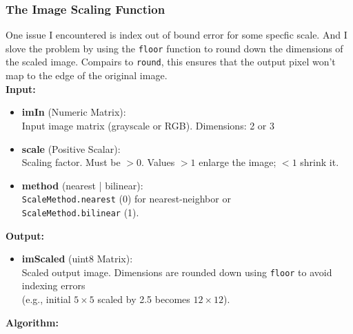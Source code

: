 \documentclass[a4paper,11pt]{article}
\begin{document}
\subsubsection{The Image Scaling Function}
One issue I encountered is index out of bound error for some specfic scale. And I slove the problem by using the \texttt{floor} function to round down the dimensions of the scaled image. Compairs to \texttt{round}, this ensures that the output pixel won't map to the edge of the original image.\\
\textbf{Input:} 
\begin{itemize}
    \item \textbf{imIn} (Numeric Matrix):\\
        Input image matrix (grayscale or RGB). Dimensions: 2 or 3
    \item \textbf{scale} (Positive Scalar):\\
        Scaling factor. Must be $>0$. Values $>1$ enlarge the image; $<1$ shrink it.
    \item \textbf{method} (nearest | bilinear):\\
        \texttt{ScaleMethod.nearest} (0) for nearest-neighbor or\\
        \texttt{ScaleMethod.bilinear} (1).
\end{itemize}
\textbf{Output:}
\begin{itemize}
    \item \textbf{imScaled} (uint8 Matrix):\\
        Scaled output image. 
        Dimensions are rounded down using \texttt{floor} to avoid indexing errors \\
        (e.g., initial $5 \times 5$ scaled by 2.5 becomes $12 \times 12$).
\end{itemize}
\textbf{Algorithm:}
\end{document}
